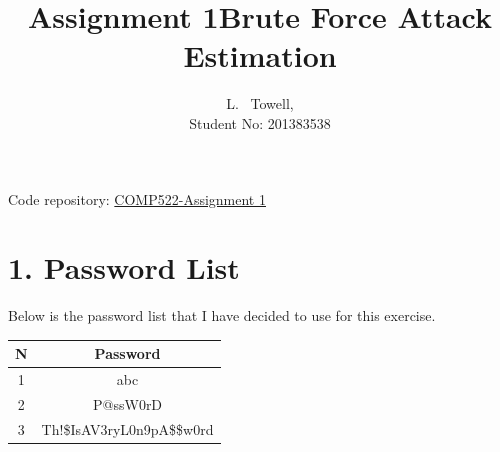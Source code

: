 \documentclass[a4paper, twoside, 11pt]{article}
\author{L. ~Towell,\\ Student No: 201383538}
\title{Assignment 1\break Brute Force Attack Estimation}
\begin{document}
	\maketitle

\maketitle
\begin{center}
Code repository: \href{https://github.com/luketowell/COMP522-Assignment1}{COMP522-Assignment 1}
\end{center}

\section*{1. Password List}
Below is the password list that I have decided to use for this exercise.
\begin{center}
	\begin{tabular}{ |c|c| } 
	 \hline
	 N & Password \\
	 \hline
	 1 & abc \\ 
	 2 & P@ssW0rD \\ 
	 3 & Th!\$IsAV3ryL0n9pA\$\$w0rd \\ 
	 \hline
	\end{tabular}
\end{center}
\end{document}
